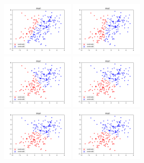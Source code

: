 \documentclass[a4paper]{article}
\begin{document}
\begin{figure}[h!]
    \centering
    \includegraphics[width=0.327\textwidth]{../ai_assn4_prog/results/2D/step0.png}
    \includegraphics[width=0.327\textwidth]{../ai_assn4_prog/results/2D/step1.png}
    \includegraphics[width=0.327\textwidth]{../ai_assn4_prog/results/2D/step2.png}
    \includegraphics[width=0.327\textwidth]{../ai_assn4_prog/results/2D/step3.png}
    \includegraphics[width=0.327\textwidth]{../ai_assn4_prog/results/2D/step4.png}
    \includegraphics[width=0.327\textwidth]{../ai_assn4_prog/results/2D/step5.png}

\end{figure}
\end{document}
